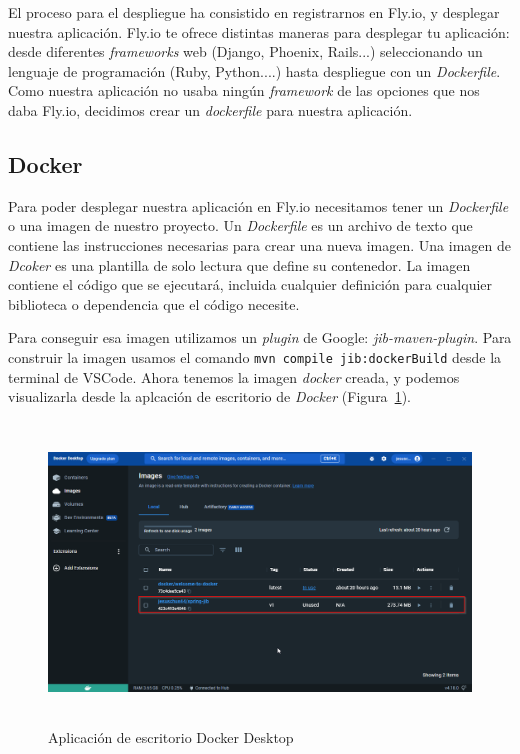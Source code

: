 El proceso para el despliegue ha consistido en registrarnos en Fly.io, y desplegar nuestra aplicación. Fly.io te ofrece distintas maneras para desplegar tu aplicación: desde diferentes \textit{frameworks} web (Django, Phoenix, Rails...) seleccionando un lenguaje de programación (Ruby, Python....) hasta despliegue con un \textit{Dockerfile}.
Como nuestra aplicación no usaba ningún \textit{framework} de las opciones que nos daba Fly.io, decidimos crear un \textit{dockerfile} para nuestra aplicación.

\subsection{Docker}

Para poder desplegar nuestra aplicación en Fly.io necesitamos tener un \textit{Dockerfile} o una imagen de nuestro proyecto.
Un \textit{Dockerfile} es un archivo de texto que contiene las instrucciones necesarias para crear una nueva imagen.
Una imagen de \textit{Dcoker} es una plantilla de solo lectura que define su contenedor. La imagen contiene el código que se ejecutará, incluida cualquier definición para cualquier biblioteca o dependencia que el código necesite.

Para conseguir esa imagen utilizamos un \textit{plugin} de Google: \textit{jib-maven-plugin}.
Para construir la imagen usamos el comando \texttt{mvn compile jib:dockerBuild} desde la terminal de VSCode. Ahora tenemos la imagen \textit{docker} creada, y podemos visualizarla desde la aplcación de escritorio de \textit{Docker} (Figura~\ref{fig:DockerDesktop}).

\begin{figure}[h]
    \centering
    \includegraphics[width=14cm, height=8cm]{Imagenes/Figuras/docker desktop.png} 
   \caption{Aplicación de escritorio Docker Desktop\label{fig:DockerDesktop}}
\end{figure}

